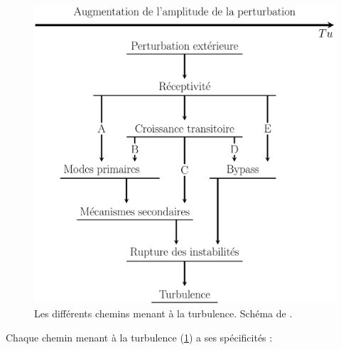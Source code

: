 \begin{figure}[!htbp]
    \centering
    \includegraphics[width=.62\linewidth]{Chap1/Pictures/Path_to_transition.pdf}
    \caption{\centering Les différents chemins menant à la turbulence. Schéma de \cite{Morkovin1994}.}
    \label{fig/Path_to_transition}
\end{figure}

Chaque chemin menant à la turbulence (\cref{fig/Path_to_transition}) a ses spécificités :

